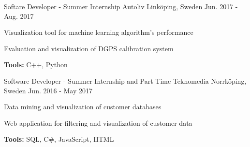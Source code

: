 \begin{cventries}
  \cventry
    {Softare Developer - Summer Internship} %
    {Autoliv} %
    {Linköping, Sweden} %
    {Jun. 2017 - Aug. 2017} %
    {
      \begin{cvitems} %
        \item {Visualization tool for machine learning algorithm's performance}
        \item {Evaluation and visualization of DGPS calibration system}
        \item {\textbf{Tools:} C++, Python}
      \end{cvitems}
    }

  \cventry
    {Software Developer - Summer Internship and Part Time} %
    {Teknomedia} %
    {Norrköping, Sweden} %
    {Jun. 2016 - May 2017} %
    {
      \begin{cvitems} %
        \item {Data mining and visualization of customer databases}
        \item {Web application for filtering and visualization of customer data}
        \item {\textbf{Tools:} SQL, C\#, JavaScript, HTML}
      \end{cvitems}
    }

\end{cventries}
